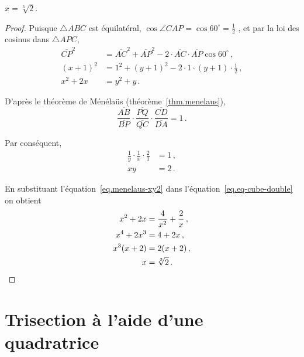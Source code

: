 \begin{theorem}
$x=\sqrt[3]{2}$.
\end{theorem}

\begin{proof}
Puisque $\triangle ABC$ est équilatéral, $\cos \angle CAP=\cos 60^\circ=\frac{1}{2}$ , et par la loi des cosinus dans $\triangle APC$,
\begin{subequations}
\begin{align}
\overline{CP}^2&=\overline{AC}^2+\overline{AP}^2-2\cdot \overline{AC}\cdot\overline{AP}\cos 60^\circ\,,\label{zozo1}\\
(x+1)^2&=1^2+(y+1)^2-2\cdot 1\cdot (y+1)\cdot \frac{1}{2}\,,\label{zozo2}\\
x^2+2x&=y^2+y\label{eq.eq-cube-double}\,.
\end{align}
\end{subequations}

D'après le théorème de Ménélaüs (théorème~\ref{thm.menelaus}),
\[
\displaystyle\frac{\overline{AB}}{\overline{BP}}\cdot
\displaystyle\frac{\overline{PQ}}{\overline{QC}}\cdot
\displaystyle\frac{\overline{CD}}{\overline{DA}}=1\,.
\]



Par conséquent,
\begin{subequations}
\begin{align}
\displaystyle\frac{1}{y}\cdot
\displaystyle\frac{1}{x}\cdot
\displaystyle\frac{2}{1}&=1\,,\label{zozo3}\\
xy&=2\,.\label{eq.menelaus-xy2}
\end{align}
\end{subequations}

En substituant l'équation~\ref{eq.menelaus-xy2} dans l'équation~\ref{eq.eq-cube-double} on obtient
\begin{align*}
x^2+2x&=\frac{4}{x^2}+\frac{2}{x}\,,\\
x^4+2x^3&=4+2x\,,\\
x^3(x+2)&=2(x+2)\,,\\
x&=\sqrt[3]{2}\,.\qedhere
\end{align*}
\end{proof}


\section{Trisection à l'aide d'une quadratrice}\label{s.q}



